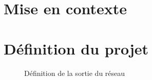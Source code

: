 \section{Mise en contexte}

\section{Définition du projet}
    \label{sec:definition_projet}
    
    \pagebreak
    \begin{figure}[H]
        \centering
        \caption[Définition de la sortie du réseau]{Définition de la sortie du réseau\footnotemark}
        \label{fig:definition_sortie_reseau}
    \end{figure}